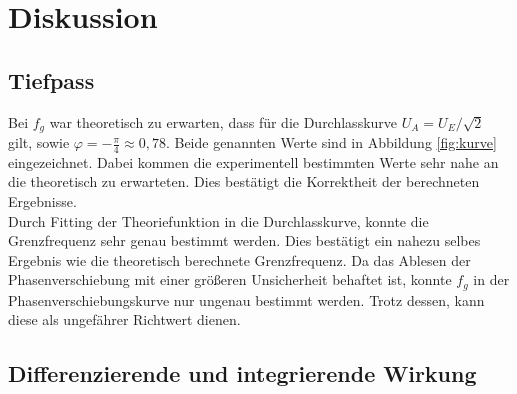 \documentclass[a4paper,usenatbib]{aspdoc}
\begin{document}
       
        
    \section{Diskussion}\label{sec:discussion}
    
        \subsection{Tiefpass}\label{subsec:discuss_tiefpass}
            Bei $f_g$ war theoretisch zu erwarten, dass für die Durchlasskurve $U_A = U_E / \sqrt{2}$ gilt, sowie $\varphi = -\frac{\pi}{4} \approx 0,78$. Beide genannten Werte sind in Abbildung \ref{fig:kurve} eingezeichnet. Dabei kommen die experimentell bestimmten Werte sehr nahe an die theoretisch zu erwarteten. Dies bestätigt die Korrektheit der berechneten Ergebnisse.
            \\
            Durch Fitting der Theoriefunktion in die Durchlasskurve, konnte die Grenzfrequenz sehr genau bestimmt werden. Dies bestätigt ein nahezu selbes Ergebnis wie die theoretisch berechnete Grenzfrequenz. Da das Ablesen der Phasenverschiebung mit einer größeren Unsicherheit behaftet ist, konnte $f_g$ in der Phasenverschiebungskurve nur ungenau bestimmt werden. Trotz dessen, kann diese als ungefährer Richtwert dienen.
            
        
        \subsection{Differenzierende und integrierende Wirkung}
\end{document}

